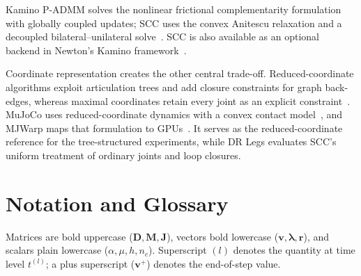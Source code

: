 \documentclass{article}
\newcommand{\M}{\mathbf{M}}
\newcommand{\Jac}{\mathbf{J}}
\newcommand{\Del}{\mathbf{D}}         %
\newcommand{\vv}{\mathbf{v}}
\newcommand{\blam}{\boldsymbol{\lambda}}
\newcommand{\rhs}{\mathbf{r}}
\theoremstyle{plain}
\theoremstyle{definition}
\begin{document}
Kamino P-ADMM solves the nonlinear frictional complementarity formulation with
globally coupled updates; SCC uses the convex Anitescu relaxation and a
decoupled bilateral--unilateral solve~\cite{tsounis2025,tsounis2026kamino}.
SCC is also available as an optional backend in Newton's Kamino
framework~\cite{newton2025}.

Coordinate representation creates the other central trade-off.
Reduced-coordinate algorithms exploit articulation trees and add closure
constraints for graph back-edges, whereas maximal coordinates retain every
joint as an explicit constraint~\cite{featherstone2008}. MuJoCo uses
reduced-coordinate dynamics with a convex contact model~\cite{todorov2014},
and MJWarp maps that formulation to GPUs~\cite{mujocowarp2026}. It serves
as the reduced-coordinate reference for the tree-structured experiments, while
DR Legs evaluates SCC's uniform treatment of ordinary joints and loop closures.

\section{Notation and Glossary}
\label{sec:notation}

Matrices are bold uppercase ($\Del,\M,\Jac$), vectors bold lowercase
($\vv,\blam,\rhs$), and scalars plain lowercase ($\alpha,\mu,h,n_c$).
Superscript $(l)$ denotes the quantity at time level $t^{(l)}$; a plus superscript
($\vv^{+}$) denotes the end-of-step value.
\end{document}
